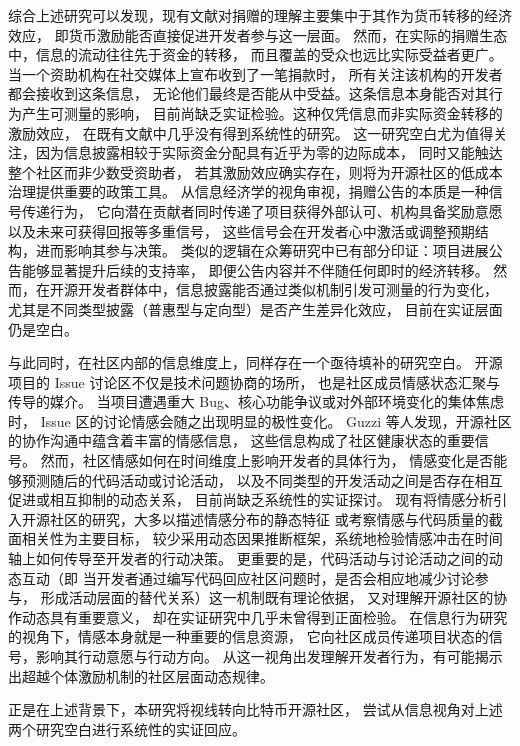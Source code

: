 \documentclass[
    type = master, %
    degree = professional,        %
    decl-page,  %
    twoside,                %
    fontset = fandol %
  ]{njuthesis}
\begin{document}
综合上述研究可以发现，现有文献对捐赠的理解主要集中于其作为货币转移的经济效应，
即货币激励能否直接促进开发者参与这一层面。
然而，在实际的捐赠生态中，信息的流动往往先于资金的转移，
而且覆盖的受众也远比实际受益者更广。
当一个资助机构在社交媒体上宣布收到了一笔捐款时，
所有关注该机构的开发者都会接收到这条信息，
无论他们最终是否能从中受益。这条信息本身能否对其行为产生可测量的影响，
目前尚缺乏实证检验。这种仅凭信息而非实际资金转移的激励效应，
在既有文献中几乎没有得到系统性的研究。
这一研究空白尤为值得关注，因为信息披露相较于实际资金分配具有近乎为零的边际成本，
同时又能触达整个社区而非少数受资助者，
若其激励效应确实存在，则将为开源社区的低成本治理提供重要的政策工具。
从信息经济学的视角审视，捐赠公告的本质是一种信号传递行为，
它向潜在贡献者同时传递了项目获得外部认可、机构具备奖励意愿以及未来可获得回报等多重信号，
这些信号会在开发者心中激活或调整预期结构，进而影响其参与决策\cite{connelly2011signaling}。
类似的逻辑在众筹研究中已有部分印证：项目进展公告能够显著提升后续的支持率，
即便公告内容并不伴随任何即时的经济转移\cite{mollick2014dynamics}。
然而，在开源开发者群体中，信息披露能否通过类似机制引发可测量的行为变化，
尤其是不同类型披露（普惠型与定向型）是否产生差异化效应，
目前在实证层面仍是空白。

与此同时，在社区内部的信息维度上，同样存在一个亟待填补的研究空白。
开源项目的 Issue 讨论区不仅是技术问题协商的场所，
也是社区成员情感状态汇聚与传导的媒介。
当项目遭遇重大 Bug、核心功能争议或对外部环境变化的集体焦虑时，
Issue 区的讨论情感会随之出现明显的极性变化。
Guzzi 等人\cite{guzzi2013}发现，开源社区的协作沟通中蕴含着丰富的情感信息，
这些信息构成了社区健康状态的重要信号。
然而，社区情感如何在时间维度上影响开发者的具体行为，
情感变化是否能够预测随后的代码活动或讨论活动，
以及不同类型的开发活动之间是否存在相互促进或相互抑制的动态关系，
目前尚缺乏系统性的实证探讨。
现有将情感分析引入开源社区的研究，大多以描述情感分布的静态特征
或考察情感与代码质量的截面相关性为主要目标\cite{guzzi2013}，
较少采用动态因果推断框架，系统地检验情感冲击在时间轴上如何传导至开发者的行动决策。
更重要的是，代码活动与讨论活动之间的动态互动（即
当开发者通过编写代码回应社区问题时，是否会相应地减少讨论参与，
形成活动层面的替代关系）这一机制既有理论依据，
又对理解开源社区的协作动态具有重要意义，
却在实证研究中几乎未曾得到正面检验。
在信息行为研究的视角下，情感本身就是一种重要的信息资源，
它向社区成员传递项目状态的信号，影响其行动意愿与行动方向。
从这一视角出发理解开发者行为，有可能揭示出超越个体激励机制的社区层面动态规律。

正是在上述背景下，本研究将视线转向比特币开源社区，
尝试从信息视角对上述两个研究空白进行系统性的实证回应。
\end{document}

